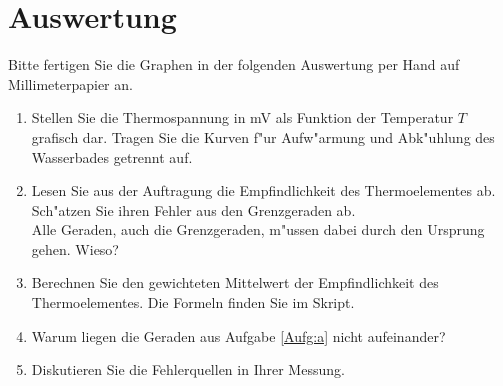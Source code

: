 \section{Auswertung} 

\begin{hint}
	Bitte fertigen Sie die Graphen in der folgenden Auswertung per Hand auf Millimeterpapier an.
\end{hint}

\begin{enumerate}
 \item Stellen Sie die Thermospannung in mV als Funktion der Temperatur $T$ grafisch dar. Tragen Sie die Kurven f"ur Aufw"armung und Abk"uhlung des Wasserbades getrennt auf. \label{Aufg:a}
 \item Lesen Sie aus der Auftragung die Empfindlichkeit des Thermoelementes ab. Sch"atzen Sie ihren Fehler aus den Grenzgeraden ab.\\
 Alle Geraden, auch die Grenzgeraden, m"ussen dabei durch den Ursprung gehen. Wieso?
 \item Berechnen Sie den gewichteten Mittelwert der Empfindlichkeit des Thermoelementes. Die Formeln finden Sie im Skript.
 \item Warum liegen die Geraden aus Aufgabe \ref{Aufg:a} nicht aufeinander?
 \item Diskutieren Sie die Fehlerquellen in Ihrer Messung.
\end{enumerate}